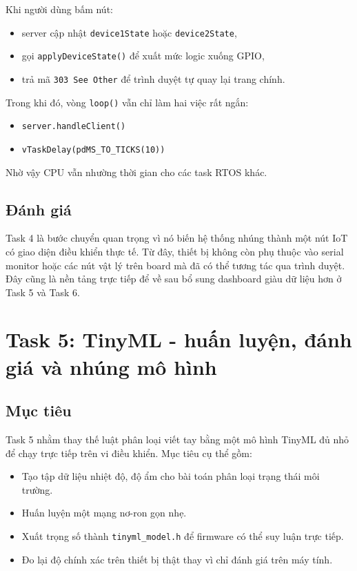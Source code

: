 \documentclass[12pt,a4paper]{article}
\begin{document}
Khi người dùng bấm nút:
\begin{itemize}
  \item server cập nhật \texttt{device1State} hoặc \texttt{device2State},
  \item gọi \texttt{applyDeviceState()} để xuất mức logic xuống GPIO,
  \item trả mã \texttt{303 See Other} để trình duyệt tự quay lại trang chính.
\end{itemize}

Trong khi đó, vòng \texttt{loop()} vẫn chỉ làm hai việc rất ngắn:
\begin{itemize}
  \item \texttt{server.handleClient()}
  \item \texttt{vTaskDelay(pdMS\_TO\_TICKS(10))}
\end{itemize}
Nhờ vậy CPU vẫn nhường thời gian cho các task RTOS khác.

\subsection{Đánh giá}

Task 4 là bước chuyển quan trọng vì nó biến hệ thống nhúng thành một nút IoT có giao diện điều khiển thực tế. Từ đây, thiết bị không còn phụ thuộc vào serial monitor hoặc các nút vật lý trên board mà đã có thể tương tác qua trình duyệt. Đây cũng là nền tảng trực tiếp để về sau bổ sung dashboard giàu dữ liệu hơn ở Task 5 và Task 6.

\section{Task 5: TinyML - huấn luyện, đánh giá và nhúng mô hình}

\subsection{Mục tiêu}

Task 5 nhằm thay thế luật phân loại viết tay bằng một mô hình TinyML đủ nhỏ để chạy trực tiếp trên vi điều khiển. Mục tiêu cụ thể gồm:
\begin{itemize}
  \item Tạo tập dữ liệu nhiệt độ, độ ẩm cho bài toán phân loại trạng thái môi trường.
  \item Huấn luyện một mạng nơ-ron gọn nhẹ.
  \item Xuất trọng số thành \texttt{tinyml\_model.h} để firmware có thể suy luận trực tiếp.
  \item Đo lại độ chính xác trên thiết bị thật thay vì chỉ đánh giá trên máy tính.
\end{itemize}
\end{document}
